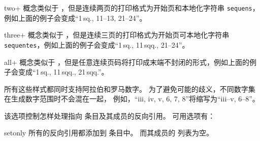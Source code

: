\begin{optionlist}
\begin{valuelist}
\item[two+] %
概念类似于 ，但是连续两页的打印格式为开始页和本地化字符串 \texttt{sequens}，例如上面的例子会变成“1\,sq., 11--13, 21--24”。

\item[three+] %
概念类似于 ，但是连续三页的打印格式为开始页可本地化字符串 \texttt{sequentes}，例如上面的例子会变成“1\,sq., 11\,sqq., 21--24”。

\item[all+] %
概念类似于 ，但是任意连续页码将打印成末端不封闭的形式，例如上面的例子会变成“1\,sq., 11\,sqq., 21\,sqq.”。

\end{valuelist}

所有这些样式都同时支持阿拉伯和罗马数字。
为了避免可能的歧义，不同数字集在生成数字范围时不会混在一起，
例如，“iii, iv, v, 6, 7, 8”将缩写为“iii--v, 6--8”。



该选项控制怎样处理指向  条目及其成员的反向引用。
可用选项有：

\begin{valuelist}

\item[setonly] %
所有的反向引用都添加到  条目中。
而其成员的  列表为空。


\end{valuelist}
\end{optionlist}
